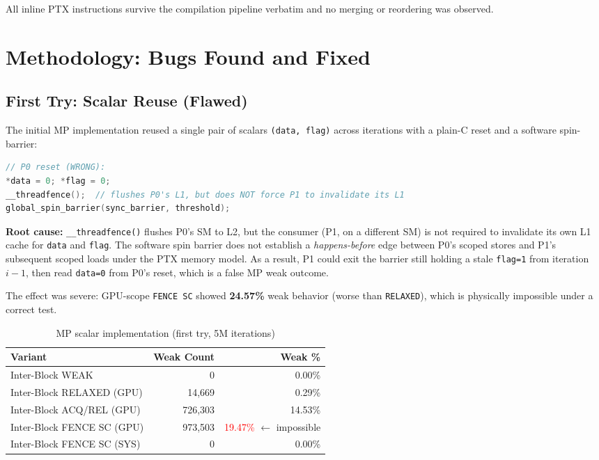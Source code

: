 \documentclass[a4paper]{article}
\begin{document}
All inline PTX instructions survive the compilation pipeline verbatim and no merging or reordering was observed.

\section{Methodology: Bugs Found and Fixed}
\label{sec:methodology}

\subsection{First Try: Scalar Reuse (Flawed)}

The initial MP implementation reused a single pair of scalars \texttt{(data, flag)} across iterations with a plain-C reset and a software spin-barrier:

\begin{lstlisting}[language=C]
// P0 reset (WRONG):
*data = 0; *flag = 0;
__threadfence();  // flushes P0's L1, but does NOT force P1 to invalidate its L1
global_spin_barrier(sync_barrier, threshold);
\end{lstlisting}

\textbf{Root cause:} \texttt{\_\_threadfence()} flushes P0's SM to L2, but the consumer (P1, on a different SM) is not required to invalidate its own L1 cache for \texttt{data} and \texttt{flag}.
The software spin barrier does not establish a \emph{happens-before} edge between P0's scoped stores and P1's subsequent scoped loads under the PTX memory model.
As a result, P1 could exit the barrier still holding a stale \texttt{flag=1} from iteration $i-1$, then read \texttt{data=0} from P0's reset, which is a false MP weak outcome.

The effect was severe: GPU-scope \texttt{FENCE SC} showed \textbf{24.57\%} weak behavior (worse than \texttt{RELAXED}), which is physically impossible under a correct test.

\begin{table}[h]
\centering
\small
\caption{MP scalar implementation (first try, 5M iterations)}
\label{tab:mp-scalar}
\begin{tabular}{lrr}
\toprule
\textbf{Variant} & \textbf{Weak Count} & \textbf{Weak \%} \\
\midrule
Inter-Block WEAK           &         0 &  0.00\% \\
Inter-Block RELAXED (GPU)  &    14,669 &  0.29\% \\
Inter-Block ACQ/REL (GPU)  &   726,303 & 14.53\% \\
Inter-Block FENCE SC (GPU) &   973,503 & \textcolor{red}{19.47\%} $\leftarrow$ impossible \\
Inter-Block FENCE SC (SYS) &         0 &  0.00\% \\
\bottomrule
\end{tabular}
\end{table}
\end{document}
